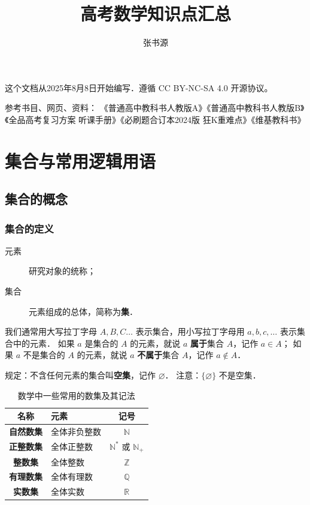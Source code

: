 \documentclass[a4paper,openany]{ctexbook}
\title{高考数学知识点汇总}
\author{张书源}
\begin{document}
\frontmatter
\maketitle
这个文档从2025年8月8日开始编写．遵循 CC BY-NC-SA 4.0 开源协议。

参考书目、网页、资料：
《普通高中教科书人教版A》《普通高中教科书人教版B》《全品高考复习方案 听课手册》《必刷题合订本2024版 狂K重难点》《维基教科书》

\tableofcontents

\mainmatter

\chapter{集合与常用逻辑用语} %

\section{集合的概念}

\subsection{集合的定义}

\begin{description}
    \item[元素] 研究对象的统称；
    \item[集合] 元素组成的总体，简称为\textbf{集}．
\end{description}

我们通常用大写拉丁字母 \(A,B,C\dots\) 表示集合，用小写拉丁字母用 \(a,b,c,\dots\) 表示集合中的元素．
如果 \(a\) 是集合的 \(A\) 的元素，就说 \(a\) \textbf{属于}集合 \(A\)，记作 \(a \in A\)；
如果 \(a\) 不是集合的 \(A\) 的元素，就说 \(a\) \textbf{不属于}集合 \(A\)，记作 \(a \not\in A\)．

规定：不含任何元素的集合叫\textbf{空集}，记作 \(\varnothing \)．
注意：\(\{\varnothing\}\) 不是空集．

\begin{table}
    \centering
    \begin{tabular}{>{\bfseries}clc}
        \toprule
        \textbf{名称} & \textbf{元素} & \textbf{记号}                        \\
        \midrule
        自然数集      & 全体非负整数  & \(\mathbb{N}\)                       \\
        正整数集      & 全体正整数    & \(\mathbb{N^*}\) 或 \(\mathbb{N_+}\) \\
        整数集        & 全体整数      & \(\mathbb{Z}\)                       \\
        有理数集      & 全体有理数    & \(\mathbb{Q}\)                       \\
        实数集        & 全体实数      & \(\mathbb{R}\)                       \\
        \bottomrule
    \end{tabular}
    \caption{数学中一些常用的数集及其记法}
\end{table}
\end{document}
